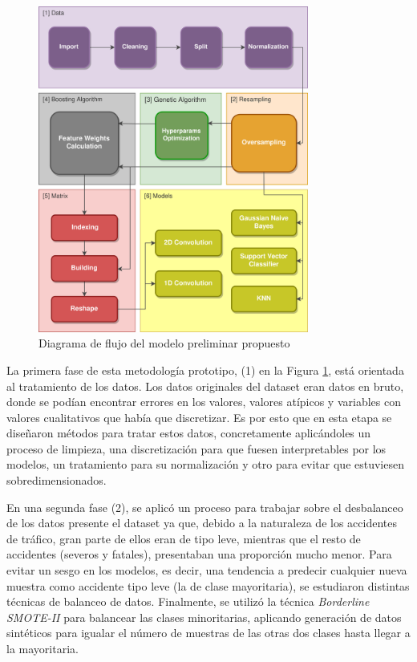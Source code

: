 \begin{figure}[h]
	\centering
	\includegraphics[width=3.5in]{Figures/1stPaper/Data_flow.png}
	\caption{Diagrama de flujo del modelo preliminar propuesto}
	\label{figDegree}
\end{figure}

La primera fase de esta metodología prototipo, (1) en la Figura \ref{figDegree}, está orientada al tratamiento de los datos. Los datos originales del dataset eran datos en bruto, donde se podían encontrar errores en los valores, valores atípicos y variables con valores cualitativos que había que discretizar. Es por esto que en esta etapa se diseñaron métodos para tratar estos datos, concretamente aplicándoles un proceso de limpieza, una discretización para que fuesen interpretables por los modelos, un tratamiento para su normalización y otro para evitar que estuviesen sobredimensionados.

En una segunda fase (2), se aplicó un proceso para trabajar sobre el desbalanceo de los datos presente el dataset ya que, debido a la naturaleza de los accidentes de tráfico, gran parte de ellos eran de tipo leve, mientras que el resto de accidentes (severos y fatales), presentaban una proporción mucho menor. Para evitar un sesgo en los modelos, es decir, una tendencia a predecir cualquier nueva muestra como accidente tipo leve (la de clase mayoritaria), se estudiaron distintas técnicas de balanceo de datos. Finalmente, se utilizó la técnica \textit{Borderline SMOTE-II} para balancear las clases minoritarias, aplicando generación de datos sintéticos para igualar el número de muestras de las otras dos clases hasta llegar a la mayoritaria.

